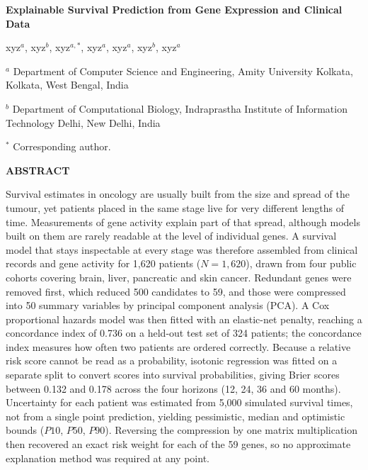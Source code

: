 \documentclass[10pt,a4paper]{article}
\begin{document}
{\LARGE\bfseries
Explainable Survival Prediction from Gene Expression and Clinical Data
\par}

\vspace{1em}

{\large
xyz$^{a}$,
xyz$^{b}$,
xyz$^{a,*}$,
xyz$^{a}$,
xyz$^{a}$,
xyz$^{b}$,
xyz$^{a}$
\par}

\vspace{0.8em}

{\small
$^{a}$ Department of Computer Science and Engineering,
Amity University Kolkata, Kolkata, West Bengal, India

$^{b}$ Department of Computational Biology,
Indraprastha Institute of Information Technology Delhi,
New Delhi, India

$^{*}$ Corresponding author.
}

\vspace{1.2em}

{\bfseries ABSTRACT\par}

Survival estimates in oncology are usually built from the size and spread of the
tumour, yet patients placed in the same stage live for very different lengths of
time. Measurements of gene activity explain part of that spread, although models
built on them are rarely readable at the level of individual genes. A survival
model that stays inspectable at every stage was therefore assembled from clinical
records and gene activity for 1,620 patients ($N = 1{,}620$), drawn from four
public cohorts covering brain, liver, pancreatic and skin cancer. Redundant genes
were removed first, which reduced 500 candidates to 59, and those were compressed
into 50 summary variables by principal component analysis (PCA). A Cox
proportional hazards model was then fitted with an elastic-net penalty, reaching a
concordance index of 0.736 on a held-out test set of 324 patients; the concordance
index measures how often two patients are ordered correctly. Because a relative
risk score cannot be read as a probability, isotonic regression was fitted on a
separate split to convert scores into survival probabilities, giving Brier scores
between 0.132 and 0.178 across the four horizons (12, 24, 36 and 60 months).
Uncertainty for each patient was estimated from 5,000 simulated survival times,
not from a single point prediction, yielding pessimistic, median and optimistic
bounds ($P10$, $P50$, $P90$). Reversing the compression by one matrix
multiplication then recovered an exact risk weight for each of the 59 genes, so no
approximate explanation method was required at any point.
\end{document}
